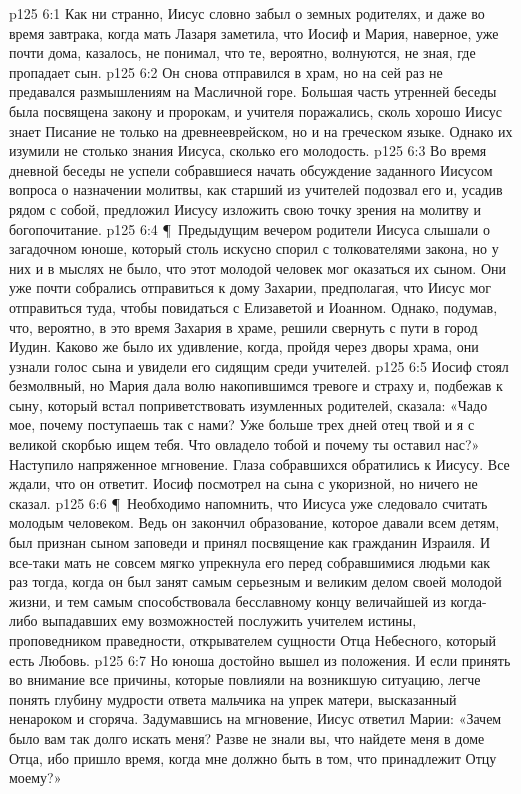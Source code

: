 \vs p125 6:1 Как ни странно, Иисус словно забыл о земных родителях, и даже во время завтрака, когда мать Лазаря заметила, что Иосиф и Мария, наверное, уже почти дома, казалось, не понимал, что те, вероятно, волнуются, не зная, где пропадает сын.
\vs p125 6:2 Он снова отправился в храм, но на сей раз не предавался размышлениям на Масличной горе. Большая часть утренней беседы была посвящена закону и пророкам, и учителя поражались, сколь хорошо Иисус знает Писание не только на древнееврейском, но и на греческом языке. Однако их изумили не столько знания Иисуса, сколько его молодость.
\vs p125 6:3 Во время дневной беседы не успели собравшиеся начать обсуждение заданного Иисусом вопроса о назначении молитвы, как старший из учителей подозвал его и, усадив рядом с собой, предложил Иисусу изложить свою точку зрения на молитву и богопочитание.
\vs p125 6:4 \P\ Предыдущим вечером родители Иисуса слышали о загадочном юноше, который столь искусно спорил с толкователями закона, но у них и в мыслях не было, что этот молодой человек мог оказаться их сыном. Они уже почти собрались отправиться к дому Захарии, предполагая, что Иисус мог отправиться туда, чтобы повидаться с Елизаветой и Иоанном. Однако, подумав, что, вероятно, в это время Захария в храме, решили свернуть с пути в город Иудин. Каково же было их удивление, когда, пройдя через дворы храма, они узнали голос сына и увидели его сидящим среди учителей.
\vs p125 6:5 Иосиф стоял безмолвный, но Мария дала волю накопившимся тревоге и страху и, подбежав к сыну, который встал поприветствовать изумленных родителей, сказала: «Чадо мое, почему поступаешь так с нами? Уже больше трех дней отец твой и я с великой скорбью ищем тебя. Что овладело тобой и почему ты оставил нас?» Наступило напряженное мгновение. Глаза собравшихся обратились к Иисусу. Все ждали, что он ответит. Иосиф посмотрел на сына с укоризной, но ничего не сказал.
\vs p125 6:6 \P\ Необходимо напомнить, что Иисуса уже следовало считать молодым человеком. Ведь он закончил образование, которое давали всем детям, был признан сыном заповеди и принял посвящение как гражданин Израиля. И все\hyp{}таки мать не совсем мягко упрекнула его перед собравшимися людьми как раз тогда, когда он был занят самым серьезным и великим делом своей молодой жизни, и тем самым способствовала бесславному концу величайшей из когда\hyp{}либо выпадавших ему возможностей послужить учителем истины, проповедником праведности, открывателем сущности Отца Небесного, который есть Любовь.
\vs p125 6:7 Но юноша достойно вышел из положения. И если принять во внимание все причины, которые повлияли на возникшую ситуацию, легче понять глубину мудрости ответа мальчика на упрек матери, высказанный ненароком и сгоряча. Задумавшись на мгновение, Иисус ответил Марии: «Зачем было вам так долго искать меня? Разве не знали вы, что найдете меня в доме Отца, ибо пришло время, когда мне должно быть в том, что принадлежит Отцу моему?»
